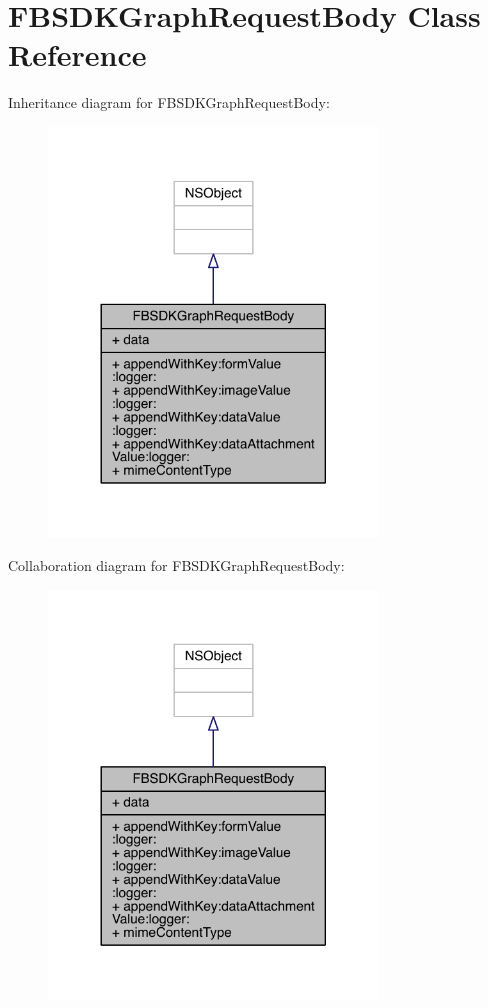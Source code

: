 \hypertarget{interface_f_b_s_d_k_graph_request_body}{\section{F\-B\-S\-D\-K\-Graph\-Request\-Body Class Reference}
\label{interface_f_b_s_d_k_graph_request_body}
}


Inheritance diagram for F\-B\-S\-D\-K\-Graph\-Request\-Body\-:
\nopagebreak
\begin{figure}[H]
\begin{center}
\leavevmode
\includegraphics[width=248pt]{interface_f_b_s_d_k_graph_request_body__inherit__graph}
\end{center}
\end{figure}


Collaboration diagram for F\-B\-S\-D\-K\-Graph\-Request\-Body\-:
\nopagebreak
\begin{figure}[H]
\begin{center}
\leavevmode
\includegraphics[width=248pt]{interface_f_b_s_d_k_graph_request_body__coll__graph}
\end{center}
\end{figure}
